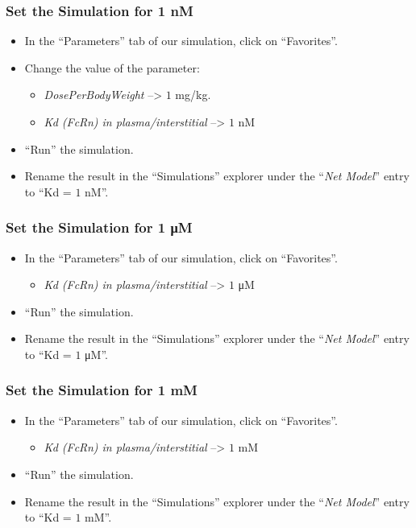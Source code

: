 \documentclass[fleqn,10pt]{physiome}
\begin{document}
\subsubsection{Set the Simulation for 1 nM}
\begin{itemize}
    \item In the ``Parameters'' tab of our simulation, click on ``Favorites''.
    \item Change the value of the parameter: 
    \begin{itemize}
        \item \textit{DosePerBodyWeight} --> $1$ mg/kg.
        \item \textit{Kd (FcRn) in plasma/interstitial} --> $1$ nM
    \end{itemize}
    \item ``Run'' the simulation.
    \item Rename the result in the ``Simulations'' explorer under the ``\textit{Net Model}'' entry to ``Kd = $1$ nM''.
\end{itemize}

\subsubsection{Set the Simulation for 1 \si{\micro M}}
\begin{itemize}
    \item In the ``Parameters'' tab of our simulation, click on ``Favorites''.
    \begin{itemize}
        \item \textit{Kd (FcRn) in plasma/interstitial} --> $1$ \si{\micro M}
    \end{itemize}
    \item ``Run'' the simulation.
    \item Rename the result in the ``Simulations'' explorer under the ``\textit{Net Model}'' entry to ``Kd = $1$ \si{\micro M}''.
\end{itemize}

\subsubsection{Set the Simulation for 1 mM}
\begin{itemize}
    \item In the ``Parameters'' tab of our simulation, click on ``Favorites''.
    \begin{itemize}
        \item \textit{Kd (FcRn) in plasma/interstitial} --> $1$ mM
    \end{itemize}
    \item ``Run'' the simulation.
    \item Rename the result in the ``Simulations'' explorer under the ``\textit{Net Model}'' entry to ``Kd = $1$ mM''.
\end{itemize}
\end{document}
